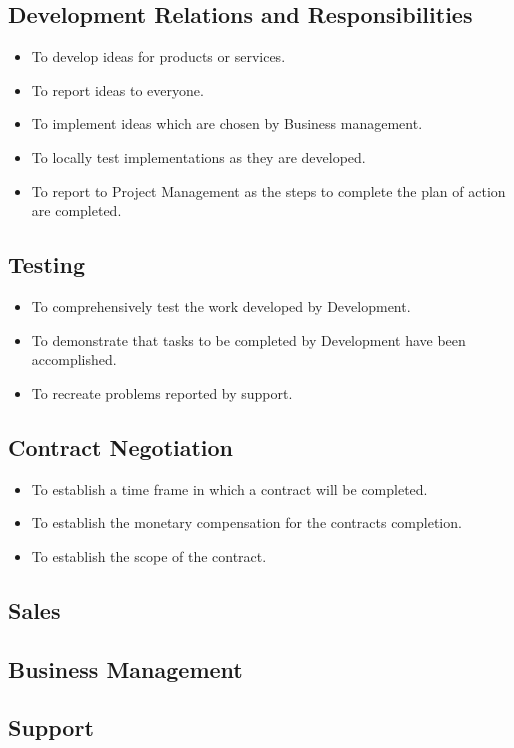 \documentclass[12pt]{extarticle}
\theoremstyle{plain}
\theoremstyle{plain}
\theoremstyle{plain}
\theoremstyle{Definition}
\theoremstyle{Definition}
\theoremstyle{Definition}
\theoremstyle{plain}
\theoremstyle{plain}
\begin{document}
	\subsection{Development Relations and Responsibilities}
		\begin{itemize}
			\item To develop ideas for products or services. 
			\item To report ideas to everyone. 
			\item To implement ideas which are chosen by Business management. 
			\item To locally test implementations as they are developed. 
			\item To report to Project Management as the steps to complete the plan of action are completed. 
		\end{itemize}
	\subsection{Testing}
		\begin{itemize}
			\item To comprehensively test the work developed by Development. 
			\item To demonstrate that tasks to be completed by Development have been accomplished. 
			\item To recreate problems reported by support. 
		\end{itemize}
	\subsection{Contract Negotiation}
		\begin{itemize}
			\item To establish a time frame in which a contract will be completed. 
			\item To establish the monetary compensation for the contracts completion. 
			\item To establish the scope of the contract. 
		\end{itemize}
	\subsection{Sales}
	\subsection{Business Management}
	\subsection{Support}		
\end{document}
